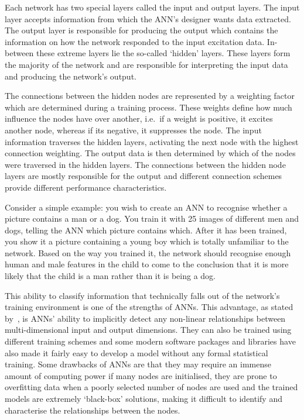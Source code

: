 Each network has two special layers called the input and output layers. The input layer accepts information from which the ANN's designer wants data extracted. The output layer is responsible for producing the output which contains the information on how the network responded to the input excitation data. In-between these extreme layers lie the so-called `hidden' layers. These layers form the majority of the network and are responsible for interpreting the input data and producing the network's output. 

The connections between the hidden nodes are represented by a weighting factor which are determined during a training process. These weights define how much influence the nodes have over another, i.e.\ if a weight is positive, it excites another node, whereas if its negative, it suppresses the node. The input information traverses the hidden layers, activating the next node with the highest connection weighting. The output data is then determined by which of the nodes were traversed in the hidden layers. The connections between the hidden node layers are mostly responsible for the output and different connection schemes provide different performance characteristics. 

Consider a simple example: you wish to create an ANN to recognise whether a picture contains a man or a dog. You train it with 25 images of different men and dogs, telling the ANN which picture contains which. After it has been trained, you show it a picture containing a young boy which is totally unfamiliar to the network. Based on the way you trained it, the network should recognise enough human and male features in the child to come to the conclusion that it is more likely that the child is a man rather than it is being a dog. 

This ability to classify information that technically falls out of the network's training environment is one of the strengths of ANNs. This advantage, as stated by~\cite{tu1996advantages}, is ANNs' ability to implicitly detect any non-linear relationships between multi-dimensional input and output dimensions. They can also be trained using different training schemes and some modern software packages and libraries have also made it fairly easy to develop a model without any formal statistical training. Some drawbacks of ANNs are that they may require an immense amount of computing power if many nodes are initialised, they are prone to overfitting data when a poorly selected number of nodes are used and the trained models are extremely `black-box' solutions, making it difficult to identify and characterise the relationships between the nodes. 

